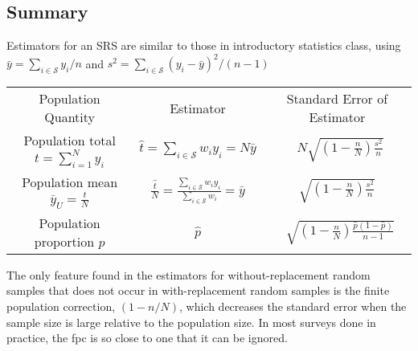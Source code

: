 \documentclass[a4paper,twoside,11pt]{article}
\begin{document}
\subsection{Summary}
Estimators for an SRS are similar to those in introductory statistics class, using $\bar{y} = \sum_{i \in \mathcal{S}} y_i /n$ and $s^2 = \sum_{i \in \mathcal{S}} (y_i - \bar{y})^2/(n-1)$
\begin{center}
\begin{tabular}{ |c| c| c|} 
 \hline
Population Quantity & Estimator & Standard Error of Estimator\\
Population total $t = \sum^N_{i=1} y_i$ & $\hat{t} = \sum_{i \in \mathcal{S}} w_i y_i = N \bar{y}$ & \ $N \sqrt{(1-\frac{n}{N})\frac{s^2}{n}}$ \\
Population mean $\bar{y}_U = \frac{t}{N}$ & $\frac{\hat{t}}{N} = \frac{\sum_{i \in \mathcal{S}}w_iy_i}{\sum_{i \in \mathcal{S}}w_i}= \bar{y}$ & $\sqrt{(1-\frac{n}{N})\frac{s^2}{n}}$ \\
Population proportion $p$ & $\hat{p}$ & \ $\sqrt{(1-\frac{n}{N})\frac{\hat{p}(1-\hat{p})}{n-1}}$ \\
 \hline
\end{tabular}
\end{center}
The only feature found in the estimators for without-replacement random samples that does not occur in with-replacement random samples is the finite population correction, $(1-n/N)$, which decreases the standard error when the sample size is large relative to the population size. In most surveys done in practice, the fpc is so close to one that it can be ignored.




\begin{equation*}
\begin{aligned}

\end{aligned}
\end{equation*}
\end{document}
